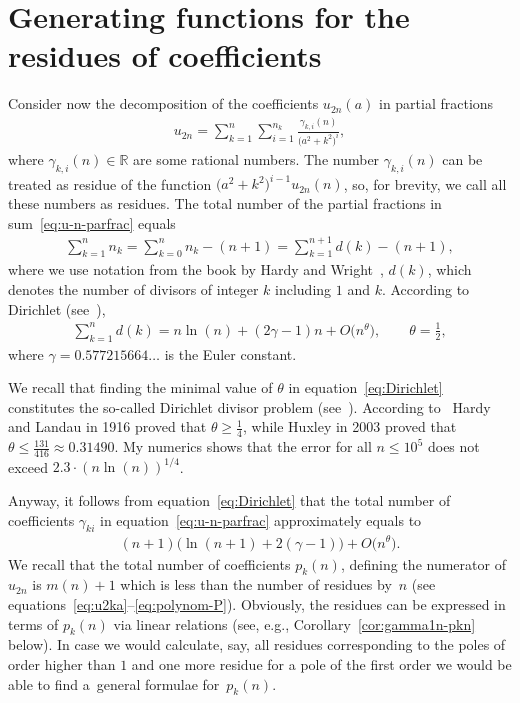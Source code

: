 \documentclass[pdftex]{sigma}
\numberwithin{equation}{section}
\begin{document}
\section{Generating functions for the residues of coefficients}\label{sec:residues}
Consider now the decomposition of the coefficients $u_{2n}(a)$ in partial fractions
\begin{gather}\label{eq:u-n-parfrac}
u_{2n}=\sum\limits_{k=1}^n\sum\limits_{i=1}^{n_k}\frac{\gamma_{k,i}(n)}{\big(a^2+k^2\big)^i},
\end{gather}
where $\gamma_{k,i}(n)\in\mathbb R$ are some rational numbers. The number $\gamma_{k,i}(n)$ can be treated as residue of
the function $\big(a^2+k^2\big)^{i-1}u_{2n}(n)$, so, for brevity, we call all these numbers as residues.
The total number of the partial fractions in sum~\eqref{eq:u-n-parfrac} equals
\begin{gather*}
\sum\limits_{k=1}^{n}n_k=\sum\limits_{k=0}^{n}n_k-(n+1)=\sum\limits_{k=1}^{n+1} d(k)-(n+1),
\end{gather*}
where we use notation from the book by Hardy and Wright~\cite{HW}, $d(k)$, which denotes the number of divisors of integer $k$
including $1$ and $k$. According to Dirichlet (see~\cite{HW}),
\begin{gather}\label{eq:Dirichlet}
\sum\limits_{k=1}^{n}d(k)=n\ln(n)+(2\gamma-1)n+O\big(n^{\theta}\big),\qquad\theta=\frac12,
\end{gather}
where $\gamma=0.577215664\ldots$ is the Euler constant.
\begin{Remark}
We recall that finding the minimal value of $\theta$ in equation~\eqref{eq:Dirichlet} constitutes the so-called
Dirichlet divisor problem (see~\cite{W}). According to~\cite{W} Hardy and Landau in 1916 proved that
$\theta\geq\frac14$, while Huxley in 2003 proved that $\theta\leq\frac{131}{416}\approx0.31490$. My numerics
shows that the error for all $n\leq10^5$ does not exceed $2.3\cdot(n\ln(n))^{1/4}$.
\end{Remark}

Anyway, it follows from equation~\eqref{eq:Dirichlet} that the total number of coefficients $\gamma_{ki}$
in equation~\eqref{eq:u-n-parfrac} approximately equals to
\begin{gather*}
(n+1)\big(\ln(n+1)+2(\gamma-1)\big)+O\big(n^{\theta}\big).
\end{gather*}
We recall that the total number of coefficients $p_k(n)$, defining the numerator of $u_{2n}$ is $m(n)+1$
which is less than the number of residues by~$n$ (see equations~\eqref{eq:u2ka}--\eqref{eq:polynom-P}).
Obviously, the residues can be expressed in terms of $p_k(n)$ via linear relations
(see, e.g., Corollary~\ref{cor:gamma1n-pkn} below). In case we would calculate, say, all residues corresponding to
the poles of order higher than $1$ and one more residue for a pole of the first order we would be able to find
a~general formulae for~$p_k(n)$.
\end{document}
